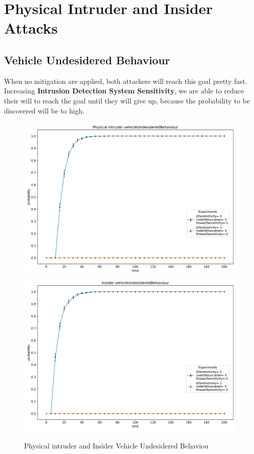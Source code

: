 \section{Physical Intruder and Insider Attacks}

\subsection*{Vehicle Undesidered Behaviour}
When no mitigation are applied, both attackers will reach this goal pretty fast. Increasing 
\textbf{Intrusion Detection System Sensitivity}, we are able to reduce their will to reach the goal
until they will give up, because the probability to be discovered will be to high.
\begin{figure}[H]
    \begin{center}
        \includegraphics[scale=0.4]{img/Physical_vOB.pdf}
        \includegraphics[scale=0.4]{img/Insider_vOB.pdf}
    \end{center}
    \caption{Physical intruder and Insider Vehicle Undesidered Behaviou}
    \label{fig:P_I_vob}
    \vspace*{-3cm}
\end{figure}

